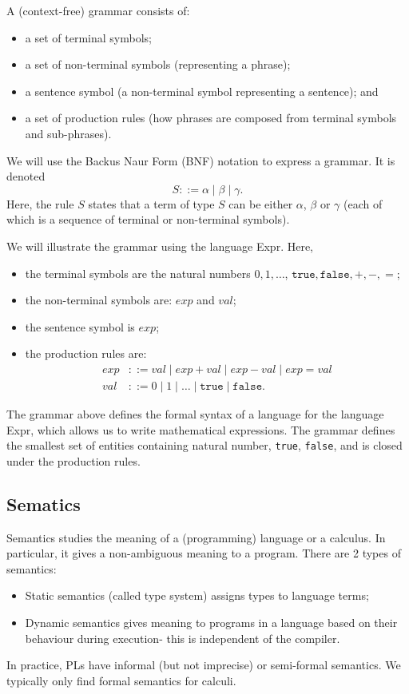 \documentclass[a4paper, openany]{memoir}
\begin{document}
    A (context-free) grammar consists of:
    \begin{itemize}
        \item a set of terminal symbols;
        \item a set of non-terminal symbols (representing a phrase);
        \item a sentence symbol (a non-terminal symbol representing a sentence); and
        \item a set of production rules (how phrases are composed from terminal symbols and sub-phrases).
    \end{itemize}

    We will use the Backus Naur Form (BNF) notation to express a grammar. It is denoted
    \[S ::= \alpha \mid \beta \mid \gamma.\]
    Here, the rule $S$ states that a term of type $S$ can be either $\alpha$, $\beta$ or $\gamma$ (each of which is a sequence of terminal or non-terminal symbols).

    We will illustrate the grammar using the language Expr.
    Here,
    \begin{itemize}
        \item the terminal symbols are the natural numbers $0, 1, \dots$, $\texttt{true}, \texttt{false}, +, -, =$;
        \item the non-terminal symbols are: $exp$ and $val$;
        \item the sentence symbol is $exp$;
        \item the production rules are:
        \begin{align*}
            exp &::= val \mid exp + val \mid exp - val \mid exp = val \\
            val &::= 0 \mid 1 \mid \dots \mid \texttt{true} \mid \texttt{false}.
        \end{align*}
    \end{itemize}
    The grammar above defines the formal syntax of a language for the language Expr, which allows us to write mathematical expressions. The grammar defines the smallest set of entities containing natural number, \texttt{true}, \texttt{false}, and is closed under the production rules.

    \subsection{Sematics}
    Semantics studies the meaning of a (programming) language or a calculus. In particular, it gives a non-ambiguous meaning to a program. There are 2 types of semantics:
    \begin{itemize}
        \item Static semantics (called type system) assigns types to language terms;
        \item Dynamic semantics gives meaning to programs in a language based on their behaviour during execution- this is independent of the compiler.
    \end{itemize}
    In practice, PLs have informal (but not imprecise) or semi-formal semantics. We typically only find formal semantics for calculi.
\end{document}
